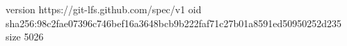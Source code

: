 version https://git-lfs.github.com/spec/v1
oid sha256:98c2fae07396c746bef16a3648bcb9b222faf71c27b01a8591ed50950252d235
size 5026
